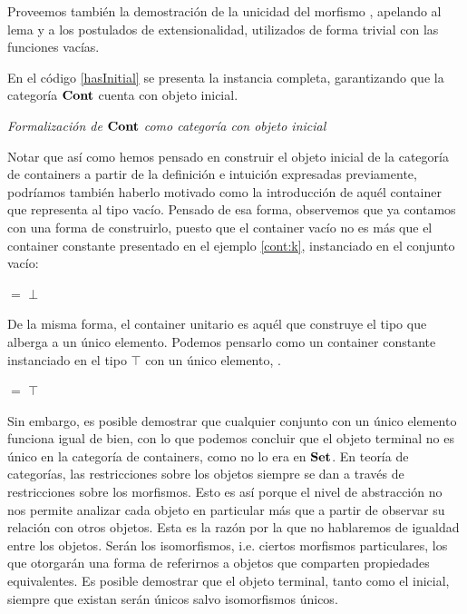 
Proveemos también la demostración de la unicidad del morfismo , apelando al lema  y a los postulados de extensionalidad, utilizados de forma trivial con las funciones vacías. 



En el código \ref{hasInitial} se presenta la instancia completa, garantizando que la categoría $\mathbf{Cont}$ cuenta con objeto inicial. 

\begin{agdacode}{\it Formalización de $\mathbf{Cont}$ como categoría con objeto inicial} \label{hasInitial}

\end{agdacode}


Notar que así como hemos pensado en construir el objeto inicial de la categoría de containers a partir de la definición e intuición expresadas previamente, podríamos también haberlo motivado como la introducción de aquél container que representa al tipo vacío. Pensado de esa forma, observemos que ya contamos con una forma de construirlo, puesto que el container vacío no es más que el container constante presentado en el ejemplo \ref{cont:k}, instanciado en el conjunto vacío:

\sangrar
{} $=$  $\bot$


De la misma forma, el container unitario es aquél que construye el tipo que alberga a un único elemento. Podemos pensarlo como un container constante instanciado en el tipo $\top$ con un único elemento, .

\sangrar
{} $=$  $\top$

Sin embargo, es posible demostrar que cualquier conjunto con un único elemento funciona igual de bien, con lo que podemos concluir que el objeto terminal no es único en la categoría de containers, como no lo era en $\mathbf{Set}$.
En teoría de categorías, las restricciones sobre los objetos siempre se dan a través de restricciones sobre los morfismos.
Esto es así porque el nivel de abstracción no nos permite analizar cada objeto en particular más que a partir de observar su relación con otros objetos. Esta es la razón por la que no hablaremos de igualdad entre los objetos. Serán los isomorfismos, i.e. ciertos morfismos particulares, los que otorgarán una forma de referirnos a objetos que comparten propiedades equivalentes.   
Es posible demostrar que el objeto terminal, tanto como el inicial, siempre que existan serán únicos salvo isomorfismos únicos.

